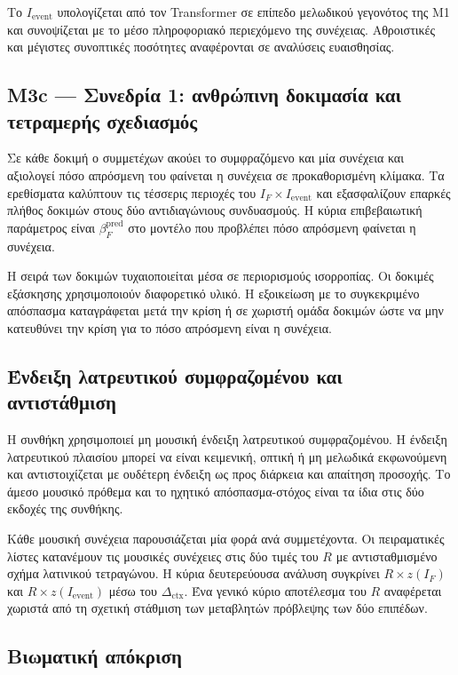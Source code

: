 \documentclass[11pt,a4paper]{article}
\begin{document}
Το $I_{\mathrm{event}}$ υπολογίζεται από τον Transformer σε επίπεδο μελωδικού γεγονότος της M1 και συνοψίζεται με το μέσο πληροφοριακό περιεχόμενο της συνέχειας. Αθροιστικές και μέγιστες συνοπτικές ποσότητες αναφέρονται σε αναλύσεις ευαισθησίας.

\subsection{M3c — Συνεδρία 1: ανθρώπινη δοκιμασία και τετραμερής σχεδιασμός}\label{app:human-m3c-task}

Σε κάθε δοκιμή ο συμμετέχων ακούει το συμφραζόμενο και μία συνέχεια και αξιολογεί πόσο απρόσμενη του φαίνεται η συνέχεια σε προκαθορισμένη κλίμακα. Τα ερεθίσματα καλύπτουν τις τέσσερις περιοχές του $I_F\times I_{\mathrm{event}}$ και εξασφαλίζουν επαρκές πλήθος δοκιμών στους δύο αντιδιαγώνιους συνδυασμούς. Η κύρια επιβεβαιωτική παράμετρος είναι $\beta_F^{\mathrm{pred}}$ στο μοντέλο που προβλέπει πόσο απρόσμενη φαίνεται η συνέχεια.

Η σειρά των δοκιμών τυχαιοποιείται μέσα σε περιορισμούς ισορροπίας. Οι δοκιμές εξάσκησης χρησιμοποιούν διαφορετικό υλικό. Η εξοικείωση με το συγκεκριμένο απόσπασμα καταγράφεται μετά την κρίση ή σε χωριστή ομάδα δοκιμών ώστε να μην κατευθύνει την κρίση για το πόσο απρόσμενη είναι η συνέχεια.

\subsection{Ένδειξη λατρευτικού συμφραζομένου και αντιστάθμιση}\label{app:human-framing}

Η συνθήκη χρησιμοποιεί μη μουσική ένδειξη λατρευτικού συμφραζομένου. Η ένδειξη λατρευτικού πλαισίου μπορεί να είναι κειμενική, οπτική ή μη μελωδικά εκφωνούμενη και αντιστοιχίζεται με ουδέτερη ένδειξη ως προς διάρκεια και απαίτηση προσοχής. Το άμεσο μουσικό πρόθεμα και το ηχητικό απόσπασμα-στόχος είναι τα ίδια στις δύο εκδοχές της συνθήκης.

Κάθε μουσική συνέχεια παρουσιάζεται μία φορά ανά συμμετέχοντα. Οι πειραματικές λίστες κατανέμουν τις μουσικές συνέχειες στις δύο τιμές του $R$ με αντισταθμισμένο σχήμα λατινικού τετραγώνου. Η κύρια δευτερεύουσα ανάλυση συγκρίνει $R\times z(I_F)$ και $R\times z(I_{\mathrm{event}})$ μέσω του $\Delta_{\mathrm{ctx}}$. Ένα γενικό κύριο αποτέλεσμα του $R$ αναφέρεται χωριστά από τη σχετική στάθμιση των μεταβλητών πρόβλεψης των δύο επιπέδων.

\subsection{Βιωματική απόκριση}\label{app:human-affect}
\end{document}
